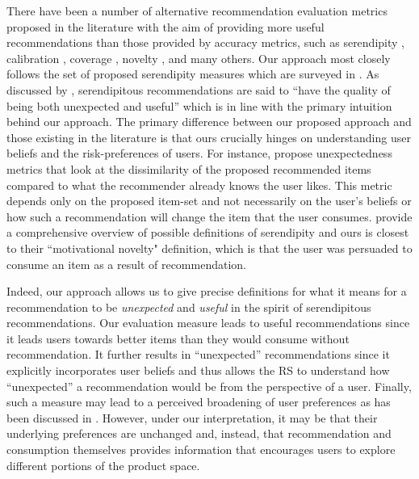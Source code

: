 \documentclass[manuscript, nonacm]{acmart}
\begin{document}
\par 
There have been a number of alternative recommendation evaluation metrics proposed in the literature with the aim of providing more useful recommendations than those provided by accuracy metrics, such as serendipity \cite{kotkov2016survey}, calibration \cite{steck2018calibrated}, coverage \cite{ge2010beyond}, novelty \cite{vargas2011rank}, and many others. Our approach most closely follows the set of proposed serendipity measures which are surveyed in \cite{kotkov2016survey}. As discussed by \cite{maksai2015predicting}, serendipitous recommendations are said to ``have the quality of being both unexpected and useful'' which is in line with the primary intuition behind our approach. The primary difference between our proposed approach and those existing in the literature is that ours crucially hinges on understanding user beliefs and the risk-preferences of users. For instance, \cite{vargas2011rank, kaminskas2014measuring} propose unexpectedness metrics that look at the dissimilarity of the proposed recommended items compared to what the recommender already knows the user likes. This metric depends only on the proposed item-set and not necessarily on the user's beliefs or how such a recommendation will change the item that the user consumes. \cite{kotkov2018investigating} provide a comprehensive overview of possible definitions of serendipity and ours is closest to their ``motivational novelty" definition, which is that the user was persuaded to consume an item as a result of recommendation.
\par 
Indeed, our approach allows us to give precise definitions for what it means for a recommendation to be \textit{unexpected} and \textit{useful} in the spirit of serendipitous recommendations. Our evaluation measure leads to useful recommendations since it leads users towards better items than they would consume without recommendation. It further results in ``unexpected'' recommendations since it explicitly incorporates user beliefs and thus allows the RS to understand how ``unexpected'' a recommendation would be from the perspective of a user. Finally, such a measure may lead to a perceived broadening of user preferences as has been discussed in \cite{herlocker2004evaluating, zhang2012auralist}. However, under our interpretation, it may be that their underlying preferences are unchanged and, instead, that recommendation and consumption themselves provides information that encourages users to explore different portions of the product space.
\newpage


\end{document}

